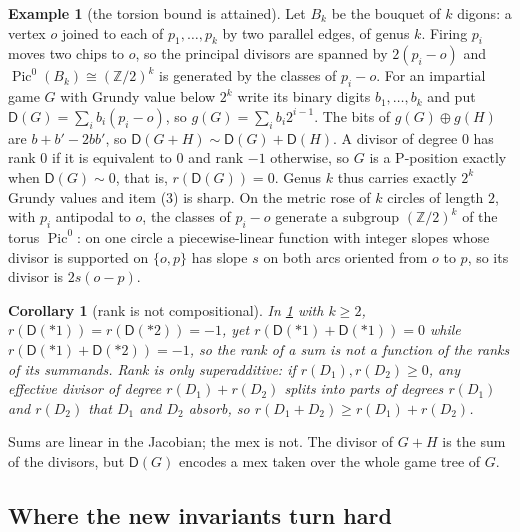 \documentclass[11pt]{amsart}
\theoremstyle{plain}
\newtheorem{corollary}[theorem]{Corollary}
\theoremstyle{definition}
\newtheorem{example}[theorem]{Example}
\theoremstyle{remark}
\numberwithin{equation}{section}
\newcommand{\ZZ}{\mathbb{Z}}
\newcommand{\Dv}{\mathsf{D}}              %
\begin{document}
\begin{example}[the torsion bound is attained]\label{ex:bouquet}
Let $B_k$ be the bouquet of $k$ digons: a vertex $o$ joined to each of $p_1,\dots,p_k$ by two parallel edges, of genus $k$. Firing $p_i$ moves two chips to $o$, so the principal divisors are spanned by $2(p_i-o)$ and $\operatorname{Pic}^0(B_k)\cong(\ZZ/2)^k$ is generated by the classes of $p_i-o$. For an impartial game $G$ with Grundy value below $2^k$ write its binary digits $b_1,\dots,b_k$ and put $\Dv(G)=\sum_ib_i(p_i-o)$, so $g(G)=\sum_ib_i2^{i-1}$. The bits of $g(G)\oplus g(H)$ are $b+b'-2bb'$, so $\Dv(G+H)\sim\Dv(G)+\Dv(H)$. A divisor of degree $0$ has rank $0$ if it is equivalent to $0$ and rank $-1$ otherwise, so $G$ is a P-position exactly when $\Dv(G)\sim0$, that is, $r(\Dv(G))=0$. Genus $k$ thus carries exactly $2^k$ Grundy values and item (3) is sharp. On the metric rose of $k$ circles of length $2$, with $p_i$ antipodal to $o$, the classes of $p_i-o$ generate a subgroup $(\ZZ/2)^k$ of the torus $\operatorname{Pic}^0$: on one circle a piecewise-linear function with integer slopes whose divisor is supported on $\{o,p\}$ has slope $s$ on both arcs oriented from $o$ to $p$, so its divisor is $2s(o-p)$.
\end{example}

\begin{corollary}[rank is not compositional]\label{cor:rank-not}
In \cref{ex:bouquet} with $k\ge2$, $r(\Dv(*1))=r(\Dv(*2))=-1$, yet $r(\Dv(*1)+\Dv(*1))=0$ while $r(\Dv(*1)+\Dv(*2))=-1$, so the rank of a sum is not a function of the ranks of its summands. Rank is only superadditive: if $r(D_1),r(D_2)\ge0$, any effective divisor of degree $r(D_1)+r(D_2)$ splits into parts of degrees $r(D_1)$ and $r(D_2)$ that $D_1$ and $D_2$ absorb, so $r(D_1+D_2)\ge r(D_1)+r(D_2)$.
\end{corollary}

Sums are linear in the Jacobian; the mex is not. The divisor of $G+H$ is the sum of the divisors, but $\Dv(G)$ encodes a mex taken over the whole game tree of $G$.

\subsection{Where the new invariants turn hard}\label{ssec:hard}
\end{document}
